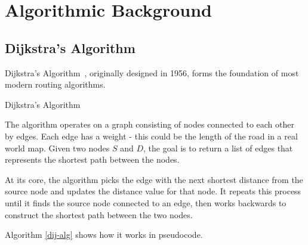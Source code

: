 \documentclass[ draft,
                    author={Alexander Hill},
                supervisor={Dr. Benjamin Sach},
                    degree={MEng},
                     title={MARMOSET: Multi Agent Real-time Multi-core Online
                     Simulation for Efficient Transportation},
                  subtitle={},
                      type={research},
                      year={2016} ]{dissertation}
\begin{document}

\section{Algorithmic Background}

\subsection{Dijkstra's Algorithm}

Dijkstra's Algorithm~\cite{dijkstra}, originally designed in 1956, forms the
foundation of most modern routing algorithms.

\begin{algorithm}[h]
\DontPrintSemicolon
\SetAlgoLined


\caption{Dijkstra's Algorithm}\label{dij-alg}
\end{algorithm}

The algorithm operates on a graph consisting of nodes connected to each other by
edges. Each edge has a weight - this could be the length of the road in a real
world map. Given two nodes $S$ and $D$, the goal is to return a list of edges that
represents the shortest path between the nodes.

At its core, the algorithm picks the edge with the next shortest distance
from the source node and updates the distance value for that node. It repeats
this process until it finds the source node connected to an edge, then works
backwards to construct the shortest path between the two nodes.

Algorithm \ref{dij-alg} shows how it works in pseudocode.
\end{document}
